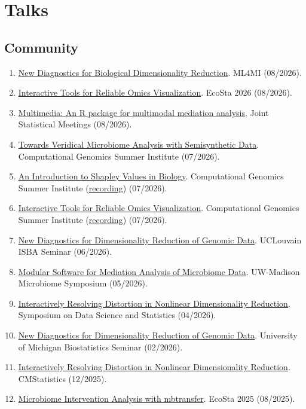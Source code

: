 \documentclass[letterpaper]{article}
\begin{document}
\section*{Talks}
\subsection*{Community}
\begin{enumerate}
  \item \href{https://go.wisc.edu/787no0}{New Diagnostics for Biological Dimensionality Reduction}. ML4MI (08/2026).
  \item \href{https://go.wisc.edu/9464wb}{Interactive Tools for Reliable Omics Visualization}. EcoSta 2026 (08/2026).
  \item \href{https://go.wisc.edu/13fpp0}{Multimedia: An R package for multimodal mediation analysis}. Joint Statistical Meetings (08/2026).
  \item \href{https://go.wisc.edu/1o429x}{Towards Veridical Microbiome Analysis with Semisynthetic Data}. Computational Genomics Summer Institute (07/2026).
  \item \href{https://krisrs1128.github.io/talks/2026/20260720/20260720.html}{An Introduction to Shapley Values in Biology}. Computational Genomics Summer Institute (\href{https://www.youtube.com/watch?v=q4mWwVna66w}{recording}) (07/2026).
  \item \href{https://go.wisc.edu/q2sk36}{Interactive Tools for Reliable Omics Visualization}. Computational Genomics Summer Institute (\href{https://www.youtube.com/watch?v=HvxIy68LSDo}{recording}) (07/2026).
  \item \href{https://go.wisc.edu/ydvn84}{New Diagnostics for Dimensionality Reduction of Genomic Data}. UCLouvain ISBA Seminar (06/2026).
  \item \href{https://go.wisc.edu/241m5e}{Modular Software for Mediation Analysis of Microbiome Data}. UW-Madison Microbiome Symposium (05/2026).
  \item \href{https://go.wisc.edu/9g3mce}{Interactively Resolving Distortion in Nonlinear Dimensionality Reduction}. Symposium on Data Science and Statistics (04/2026).
  \item \href{https://go.wisc.edu/mzhs15}{New Diagnostics for Dimensionality Reduction of Genomic Data}. University of Michigan Biostatistics Seminar (02/2026).
  \item \href{https://go.wisc.edu/ozm0il}{Interactively Resolving Distortion in Nonlinear Dimensionality Reduction}. CMStatistics (12/2025).
  \item \href{https://go.wisc.edu/7kgrbo}{Microbiome Intervention Analysis with mbtransfer}. EcoSta 2025 (08/2025).

\end{enumerate}
\end{document}
